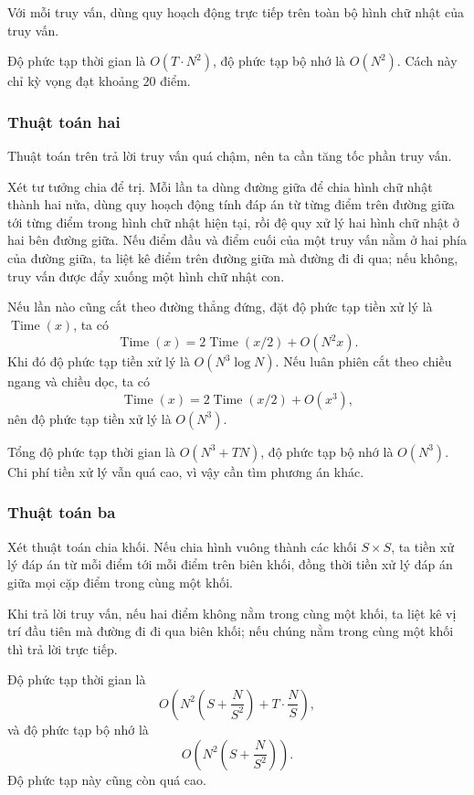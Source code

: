 \documentclass[11pt]{article}
\begin{document}
Với mỗi truy vấn, dùng quy hoạch động trực tiếp trên toàn bộ hình chữ nhật
của truy vấn.

Độ phức tạp thời gian là \(O(T\cdot N^2)\), độ phức tạp bộ nhớ là
\(O(N^2)\). Cách này chỉ kỳ vọng đạt khoảng \(20\) điểm.

\subsubsection{Thuật toán hai}

Thuật toán trên trả lời truy vấn quá chậm, nên ta cần tăng tốc phần truy vấn.

Xét tư tưởng chia để trị. Mỗi lần ta dùng đường giữa để chia hình chữ nhật
thành hai nửa, dùng quy hoạch động tính đáp án từ từng điểm trên đường giữa
tới từng điểm trong hình chữ nhật hiện tại, rồi đệ quy xử lý hai hình chữ
nhật ở hai bên đường giữa. Nếu điểm đầu và điểm cuối của một truy vấn nằm ở
hai phía của đường giữa, ta liệt kê điểm trên đường giữa mà đường đi đi qua;
nếu không, truy vấn được đẩy xuống một hình chữ nhật con.

Nếu lần nào cũng cắt theo đường thẳng đứng, đặt độ phức tạp tiền xử lý là
\(\operatorname{Time}(x)\), ta có
\[
  \operatorname{Time}(x)
  =2\operatorname{Time}(x/2)+O(N^2x).
\]
Khi đó độ phức tạp tiền xử lý là \(O(N^3\log N)\). Nếu luân phiên cắt theo
chiều ngang và chiều dọc, ta có
\[
  \operatorname{Time}(x)
  =2\operatorname{Time}(x/2)+O(x^3),
\]
nên độ phức tạp tiền xử lý là \(O(N^3)\).

Tổng độ phức tạp thời gian là \(O(N^3+TN)\), độ phức tạp bộ nhớ là
\(O(N^3)\). Chi phí tiền xử lý vẫn quá cao, vì vậy cần tìm phương án khác.

\subsubsection{Thuật toán ba}

Xét thuật toán chia khối. Nếu chia hình vuông thành các khối \(S\times S\),
ta tiền xử lý đáp án từ mỗi điểm tới mỗi điểm trên biên khối, đồng thời tiền
xử lý đáp án giữa mọi cặp điểm trong cùng một khối.

Khi trả lời truy vấn, nếu hai điểm không nằm trong cùng một khối, ta liệt kê
vị trí đầu tiên mà đường đi đi qua biên khối; nếu chúng nằm trong cùng một
khối thì trả lời trực tiếp.

Độ phức tạp thời gian là
\[
  O\left(N^2\left(S+\frac{N}{S^2}\right)
    +T\cdot\frac{N}{S}\right),
\]
và độ phức tạp bộ nhớ là
\[
  O\left(N^2\left(S+\frac{N}{S^2}\right)\right).
\]
Độ phức tạp này cũng còn quá cao.
\end{document}
